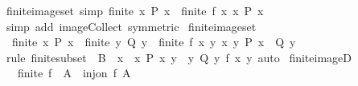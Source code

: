 \begin{isabellebody}
\endisatagproof
{\isafoldproof}%
%
\isadelimproof
\isanewline
%
\endisadelimproof
\isanewline
{}\isamarkupfalse%
\ finite{\isacharunderscore}{\kern0pt}image{\isacharunderscore}{\kern0pt}set\ {\isacharbrackleft}{\kern0pt}simp{\isacharbrackright}{\kern0pt}{\isacharcolon}{\kern0pt}\ {\isachardoublequoteopen}finite\ {\isacharbraceleft}{\kern0pt}x{\isachardot}{\kern0pt}\ P\ x{\isacharbraceright}{\kern0pt}\ {\isasymLongrightarrow}\ finite\ {\isacharbraceleft}{\kern0pt}f\ x\ {\isacharbar}{\kern0pt}x{\isachardot}{\kern0pt}\ P\ x{\isacharbraceright}{\kern0pt}{\isachardoublequoteclose}\isanewline
%
\isadelimproof
\ \ %
\endisadelimproof
%
\isatagproof
{}\isamarkupfalse%
\ {\isacharparenleft}{\kern0pt}simp\ add{\isacharcolon}{\kern0pt}\ image{\isacharunderscore}{\kern0pt}Collect\ {\isacharbrackleft}{\kern0pt}symmetric{\isacharbrackright}{\kern0pt}{\isacharparenright}{\kern0pt}%
\endisatagproof
{\isafoldproof}%
%
\isadelimproof
\isanewline
%
\endisadelimproof
\isanewline
{}\isamarkupfalse%
\ finite{\isacharunderscore}{\kern0pt}image{\isacharunderscore}{\kern0pt}set{}{\isacharcolon}{\kern0pt}\isanewline
\ \ {\isachardoublequoteopen}finite\ {\isacharbraceleft}{\kern0pt}x{\isachardot}{\kern0pt}\ P\ x{\isacharbraceright}{\kern0pt}\ {\isasymLongrightarrow}\ finite\ {\isacharbraceleft}{\kern0pt}y{\isachardot}{\kern0pt}\ Q\ y{\isacharbraceright}{\kern0pt}\ {\isasymLongrightarrow}\ finite\ {\isacharbraceleft}{\kern0pt}f\ x\ y\ {\isacharbar}{\kern0pt}x\ y{\isachardot}{\kern0pt}\ P\ x\ {\isasymand}\ Q\ y{\isacharbraceright}{\kern0pt}{\isachardoublequoteclose}\isanewline
%
\isadelimproof
\ \ %
\endisadelimproof
%
\isatagproof
{}\isamarkupfalse%
\ {\isacharparenleft}{\kern0pt}rule\ finite{\isacharunderscore}{\kern0pt}subset\ {\isacharbrackleft}{\kern0pt}\ B\ {\isacharequal}{\kern0pt}\ {\isachardoublequoteopen}{\isasymUnion}x\ {\isasymin}\ {\isacharbraceleft}{\kern0pt}x{\isachardot}{\kern0pt}\ P\ x{\isacharbraceright}{\kern0pt}{\isachardot}{\kern0pt}\ {\isasymUnion}y\ {\isasymin}\ {\isacharbraceleft}{\kern0pt}y{\isachardot}{\kern0pt}\ Q\ y{\isacharbraceright}{\kern0pt}{\isachardot}{\kern0pt}\ {\isacharbraceleft}{\kern0pt}f\ x\ y{\isacharbraceright}{\kern0pt}{\isachardoublequoteclose}{\isacharbrackright}{\kern0pt}{\isacharparenright}{\kern0pt}\ auto%
\endisatagproof
{\isafoldproof}%
%
\isadelimproof
\isanewline
%
\endisadelimproof
\isanewline
{}\isamarkupfalse%
\ finite{\isacharunderscore}{\kern0pt}imageD{\isacharcolon}{\kern0pt}\isanewline
\ \ \ {\isachardoublequoteopen}finite\ {\isacharparenleft}{\kern0pt}f\ {\isacharbackquote}{\kern0pt}\ A{\isacharparenright}{\kern0pt}{\isachardoublequoteclose}\ \ {\isachardoublequoteopen}inj{\isacharunderscore}{\kern0pt}on\ f\ A{\isachardoublequoteclose}\isanewline

\end{isabellebody}
